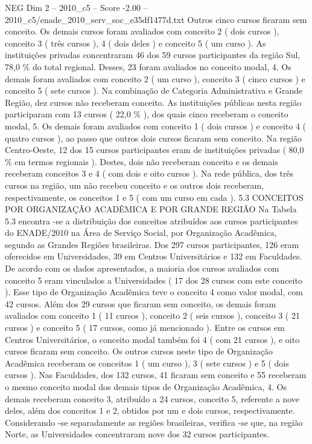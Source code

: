 \begin{textsample}{NEG Dim 2 – 2010\_c5 – Score -2.00 – 2010\_c5/enade\_2010\_serv\_soc\_e35df1477d.txt}
Outros cinco cursos ficaram sem conceito.
Os demais cursos foram avaliados com conceito 2 ( dois cursos ), conceito 3 ( três cursos ), 4 ( dois deles ) e conceito 5 ( um curso ).
As instituições privadas concentraram 46 dos 59 cursos participantes da região Sul, 78,0 \% do total regional.
Desses, 23 foram avaliados no conceito modal, 4.
Os demais foram avaliados com conceito 2 ( um curso ), conceito 3 ( cinco cursos ) e conceito 5 ( sete cursos ).
Na combinação de Categoria Administrativa e Grande Região, dez cursos não receberam conceito.
As instituições públicas nesta região participaram com 13 cursos ( 22,0 \% ), dos quais cinco receberam o conceito modal, 5.
Os demais foram avaliados com conceito 1 ( dois cursos ) e conceito 4 ( quatro cursos ), ao passo que outros dois cursos ficaram sem conceito.
Na região Centro-Oeste, 12 dos 15 cursos participantes eram de instituições privadas ( 80,0 \% em termos regionais ).
Destes, dois não receberam conceito e os demais receberam conceitos 3 e 4 ( com dois e oito cursos ).
Na rede pública, dos três cursos na região, um não recebeu conceito e os outros dois receberam, respectivamente, os conceitos 1 e 5 ( com um curso em cada ). 5.3 CONCEITOS POR ORGANIZAÇÃO ACADÊMICA E POR GRANDE REGIÃO Na Tabela 5.3 encontra -se a distribuição dos conceitos atribuídos aos cursos participantes do ENADE/2010 na Área de Serviço Social, por Organização Acadêmica, segundo as Grandes Regiões brasileiras.
Dos 297 cursos participantes, 126 eram oferecidos em Universidades, 39 em Centros Universitários e 132 em Faculdades.
De acordo com os dados apresentados, a maioria dos cursos avaliados com conceito 5 eram vinculados a Universidades ( 17 dos 28 cursos com este conceito ).
Esse tipo de Organização Acadêmica teve o conceito 4 como valor modal, com 42 cursos.
Além dos 29 cursos que ficaram sem conceito, os demais foram avaliados com conceito 1 ( 11 cursos ), conceito 2 ( seis cursos ), conceito 3 ( 21 cursos ) e conceito 5 ( 17 cursos, como já mencionado ).
Entre os cursos em Centros Universitários, o conceito modal também foi 4 ( com 21 cursos ), e oito cursos ficaram sem conceito.
Os outros cursos neste tipo de Organização Acadêmica receberam os conceitos 1 ( um curso ), 3 ( sete cursos ) e 5 ( dois cursos ).
Nas Faculdades, dos 132 cursos, 41 ficaram sem conceito e 55 receberam o mesmo conceito modal dos demais tipos de Organização Acadêmica, 4.
Os demais receberam conceito 3, atribuído a 24 cursos, conceito 5, referente a nove deles, além dos conceitos 1 e 2, obtidos por um e dois cursos, respectivamente.
Considerando -se separadamente as regiões brasileiras, verifica -se que, na região Norte, as Universidades concentraram nove dos 32 cursos participantes.

\end{textsample}

